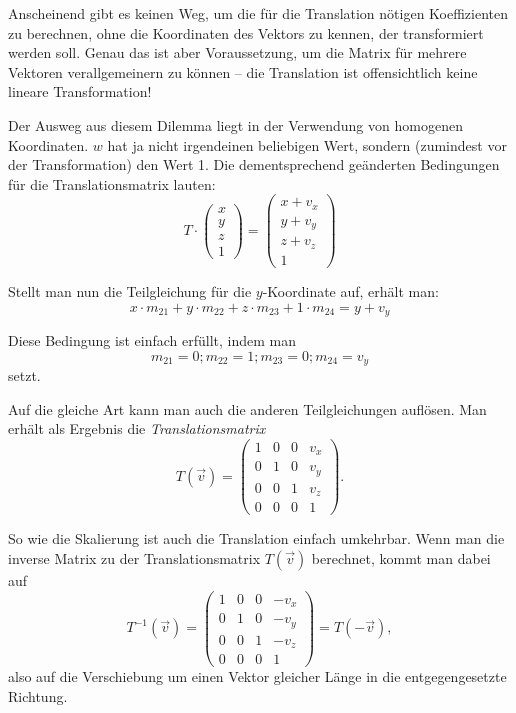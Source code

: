 Anscheinend gibt es keinen Weg, um die für die Translation nötigen Koeffizienten zu berechnen, ohne die Koordinaten des Vektors zu kennen, der transformiert werden soll. Genau das ist aber Voraussetzung, um die Matrix für mehrere Vektoren verallgemeinern zu können -- die Translation ist offensichtlich keine lineare Transformation!

Der Ausweg aus diesem Dilemma liegt in der Verwendung von homogenen Koordinaten. $w$ hat ja nicht irgendeinen beliebigen Wert, sondern (zumindest vor der Transformation) den Wert 1. Die dementsprechend geänderten Bedingungen für die Translationsmatrix lauten:
\begin{equation}
 T \cdot 
 \begin{pmatrix}
  x \\
  y \\
  z \\
  1
 \end{pmatrix}
 =
 \begin{pmatrix}
  x + v_x \\
  y + v_y \\
  z + v_z \\
  1
 \end{pmatrix}
\end{equation}

Stellt man nun die Teilgleichung für die $y$-Koordinate auf, erhält man:
\begin{equation}
 x \cdot m_{21} + y \cdot m_{22} + z \cdot m_{23} + 1 \cdot m_{24} = y + v_y
\end{equation}

Diese Bedingung ist einfach erfüllt, indem man
\begin{equation}
 m_{21} = 0; m_{22} = 1; m_{23} = 0; m_{24} = v_y
\end{equation}
setzt.

Auf die gleiche Art kann man auch die anderen Teilgleichungen auflösen. Man erhält als Ergebnis die \emph{Translationsmatrix}
\begin{equation}
 T{(\vec v)} =
 \begin{pmatrix}
  1 & 0 & 0 & v_x \\
  0 & 1 & 0 & v_y \\
  0 & 0 & 1 & v_z \\
  0 & 0 & 0 & 1
 \end{pmatrix}.
\end{equation}

So wie die Skalierung ist auch die Translation einfach umkehrbar. Wenn man die inverse Matrix zu der Translationsmatrix $T{(\vec v)}$ berechnet, kommt man dabei auf
\begin{equation}
 T^{-1}{(\vec v)} =
 \begin{pmatrix}
  1 & 0 & 0 & -v_x \\
  0 & 1 & 0 & -v_y \\
  0 & 0 & 1 & -v_z \\
  0 & 0 & 0 & 1
 \end{pmatrix} = T{(-\vec v)},
\end{equation}
also auf die Verschiebung um einen Vektor gleicher Länge in die entgegengesetzte Richtung.

